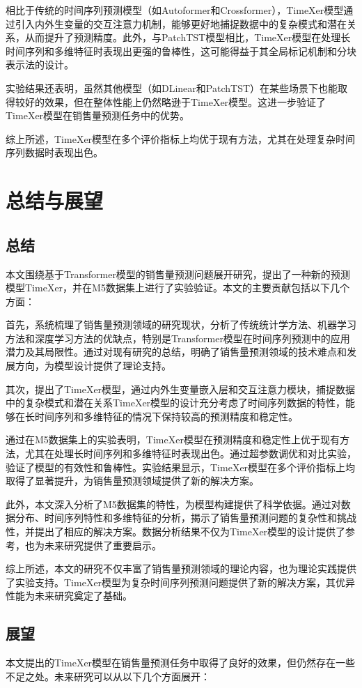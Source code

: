\documentclass[12pt]{article}
\begin{document}
相比于传统的时间序列预测模型（如Autoformer和Crossformer），TimeXer模型通过引入内外生变量的交互注意力机制，能够更好地捕捉数据中的复杂模式和潜在关系，从而提升了预测精度。此外，与PatchTST模型相比，TimeXer模型在处理长时间序列和多维特征时表现出更强的鲁棒性，这可能得益于其全局标记机制和分块表示法的设计。

实验结果还表明，虽然其他模型（如DLinear和PatchTST）在某些场景下也能取得较好的效果，但在整体性能上仍然略逊于TimeXer模型。这进一步验证了TimeXer模型在销售量预测任务中的优势。

综上所述，TimeXer模型在多个评价指标上均优于现有方法，尤其在处理复杂时间序列数据时表现出色。

\newpage
\section{总结与展望}
\subsection{总结}
本文围绕基于Transformer模型的销售量预测问题展开研究，提出了一种新的预测模型TimeXer，并在M5数据集上进行了实验验证。本文的主要贡献包括以下几个方面：

首先，系统梳理了销售量预测领域的研究现状，分析了传统统计学方法、机器学习方法和深度学习方法的优缺点，特别是Transformer模型在时间序列预测中的应用潜力及其局限性。通过对现有研究的总结，明确了销售量预测领域的技术难点和发展方向，为模型设计提供了理论支持。

其次，提出了TimeXer模型，通过内外生变量嵌入层和交互注意力模块，捕捉数据中的复杂模式和潜在关系TimeXer模型的设计充分考虑了时间序列数据的特性，能够在长时间序列和多维特征的情况下保持较高的预测精度和稳定性。

通过在M5数据集上的实验表明，TimeXer模型在预测精度和稳定性上优于现有方法，尤其在处理长时间序列和多维特征时表现出色。通过超参数调优和对比实验，验证了模型的有效性和鲁棒性。实验结果显示，TimeXer模型在多个评价指标上均取得了显著提升，为销售量预测领域提供了新的解决方案。

此外，本文深入分析了M5数据集的特性，为模型构建提供了科学依据。通过对数据分布、时间序列特性和多维特征的分析，揭示了销售量预测问题的复杂性和挑战性，并提出了相应的解决方案。数据分析结果不仅为TimeXer模型的设计提供了参考，也为未来研究提供了重要启示。

综上所述，本文的研究不仅丰富了销售量预测领域的理论内容，也为理论实践提供了实验支持。TimeXer模型为复杂时间序列预测问题提供了新的解决方案，其优异性能为未来研究奠定了基础。

\subsection{展望}
本文提出的TimeXer模型在销售量预测任务中取得了良好的效果，但仍然存在一些不足之处。未来研究可以从以下几个方面展开：
\end{document}
